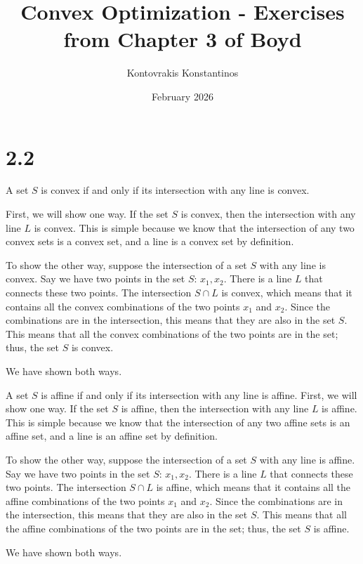 \documentclass{article}
\title{Convex Optimization - Exercises from Chapter 3 of Boyd}
\author{Kontovrakis Konstantinos}
\date{February 2026}
\begin{document}
\maketitle

\section*{2.2}

 A set $S$ is convex if and only if its intersection with any line is convex.


 First, we will show one way. If the set $S$ is convex, then the intersection with any line $L$ is convex. This is simple because we know that the intersection of any two convex sets is a convex set, and a line is a convex set by definition.

 To show the other way, suppose the intersection of a set $S$ with any line is convex. Say we have two points in the set $S$: $x_1, x_2$. There is a line $L$ that connects these two points. The intersection $S \cap L$ is convex, which means that it contains all the convex combinations of the two points $x_1$ and $x_2$. Since the combinations are in the intersection, this means that they are also in the set $S$. This means that all the convex combinations of the two points are in the set; thus, the set $S$ is convex. 

We have shown both ways.


\medskip
 A set $S$ is affine if and only if its intersection with any line is affine.
 First, we will show one way. If the set $S$ is affine, then the intersection with any line $L$ is affine. This is simple because we know that the intersection of any two affine sets is an affine set, and a line is an affine set by definition.

 
 To show the other way, suppose the intersection of a set $S$ with any line is affine. Say we have two points in the set $S$: $x_1, x_2$. There is a line $L$ that connects these two points. The intersection $S \cap L$ is affine, which means that it contains all the affine combinations of the two points $x_1$ and $x_2$. Since the combinations are in the intersection, this means that they are also in the set $S$. This means that all the affine combinations of the two points are in the set; thus, the set $S$ is affine. 

We have shown both ways.






\newpage
\end{document}

